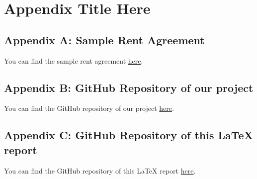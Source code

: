 
\chapter*{Appendix Title Here}

\label{AppendixX}

\section*{Appendix A: Sample Rent Agreement}
You can find the sample rent agreement \href{https://drive.google.com/file/d/1uSjtAyWIzzlc5nrVXWXlzoXDP60ig2CV/view?usp=drive_link}{here}.

\section*{Appendix B: GitHub Repository of our project}
You can find the GitHub repository of our project \href{https://github.com/ayush0402/humara-ghar}{here}.

\section*{Appendix C: GitHub Repository of this LaTeX report}
You can find the GitHub repository of this LaTeX report \href{https://github.com/ayush0402/humara-ghar-report}{here}.
